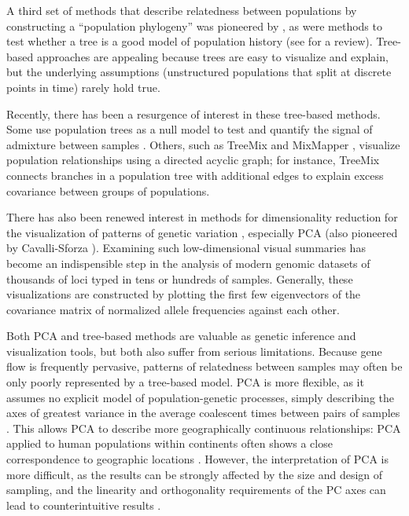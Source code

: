 \documentclass[12pt]{article}
\begin{document}
A third set of methods that describe relatedness between populations by constructing a ``population phylogeny''
was pioneered by \cite{cavallisforza_edwards1967}, 
as were methods to test whether a tree is a good model of population history \citep{CavalliSforza1975} (see \citep{Felsenstein1982} for a review).
Tree-based approaches are appealing because trees are easy to visualize and explain,
but the underlying assumptions (unstructured populations that split at discrete points in time)
rarely hold true.
 
Recently, there has been a resurgence of interest in these tree-based methods.  
Some use population trees as a null model to test and quantify the signal of admixture between samples \cite{reich_india_2009}.  
Others, such as TreeMix \citep{Treemix} and MixMapper \citep{lipson_mixmapper_2013}, 
visualize population relationships using a directed acyclic graph;
for instance, TreeMix connects branches in a population tree with additional edges
to explain excess covariance between groups of populations.

There has also been renewed interest in methods for dimensionality reduction
for the visualization of patterns of genetic variation \citep{Patterson2006},
especially PCA (also pioneered by Cavalli-Sforza \citep{menozzi1978synthetic}). 
Examining such low-dimensional visual summaries has become an indispensible step in
the analysis of modern genomic datasets of thousands of loci typed in tens or hundreds of samples.
Generally, these visualizations are constructed by plotting the first few eigenvectors of the covariance matrix
of normalized allele frequencies against each other.

Both PCA and tree-based methods are valuable as genetic inference and visualization tools, but both also suffer from serious limitations.  
Because gene flow is frequently pervasive, patterns of relatedness between samples may often be only poorly represented by a tree-based model.  
PCA is more flexible, as it assumes no explicit model of population-genetic processes, 
simply describing the axes of greatest variance in the average coalescent times between pairs of samples \citep{mcvean_genealogical_2009}. 
This allows PCA to describe more geographically continuous relationships: 
PCA applied to human populations within continents often shows a close correspondence to geographic locations \citep[e.g.][]{novembre_genes_2008,wang_quantitative_2012}.  
However, the interpretation of PCA is more difficult, as the results can be strongly affected by the size and design of sampling, 
and the linearity and orthogonality requirements of the PC axes can lead to counterintuitive results \citep{novembre_interpreting_2008, Francois_2010_surfing}.
\end{document}
